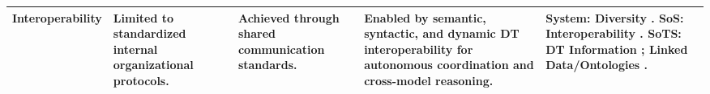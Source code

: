 \begin{table}[htbp]
\begin{adjustbox}{center}
\begin{tabularx}{1.15\textwidth}{
  >{\raggedright\arraybackslash}p{2.5cm}
  >{\raggedright\arraybackslash}p{3cm}
  >{\raggedright\arraybackslash}p{3cm}
  >{\raggedright\arraybackslash}p{3.7cm}
  >{\raggedright\arraybackslash}X }
\hline

Interoperability &
Limited to standardized internal organizational protocols. &
Achieved through shared communication standards. &
Enabled by semantic, syntactic, and dynamic DT interoperability for autonomous coordination and cross-model reasoning. &
\textbf{System:} Diversity \cite{boardman2006system}.\newline
\textbf{SoS:} Interoperability \cite{nielsen2015systems}.\newline
\textbf{SoTS:} DT Information \cite{gill2024toward}; Linked Data/Ontologies \cite{olsson2023systems}. \\

\hline
\end{tabularx}
\end{adjustbox}
\end{table}